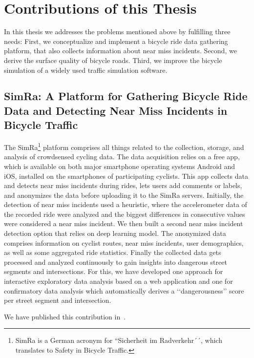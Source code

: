 \section{Contributions of this Thesis}
\label{sec:contributions}
In this thesis we addresses the problems mentioned above by fulfilling three needs:
First, we conceptualize and implement a bicycle ride data gathering platform, that also collects information about near miss incidents.
Second, we derive the surface quality of bicycle roads.
Third, we improve the bicycle simulation of a widely used traffic simulation software.

\subsection{SimRa: A Platform for Gathering Bicycle Ride Data and Detecting Near Miss Incidents in Bicycle Traffic}
\label{subsec:simra_contribution}
The SimRa\footnote{SimRa is a German acronym for ``Sicherheit im Radverkehr´´, which translates to Safety in Bicycle Traffic.} platform comprises all things related to the collection, storage, and analysis of crowdsensed cycling data.
The data acquisition relies on a free app, which is available on both major smartphone operating systems Android and iOS, installed on the smartphones of participating cyclists.
This app collects data and detects near miss incidents during rides, lets users add comments or labels, and anonymizes the data before uploading it to the SimRa servers.
Initially, the detection of near miss incidents used a heuristic, where the accelerometer data of the recorded ride were analyzed and the biggest differences in consecutive values were considered a near miss incident.
We then built a second near miss incident detection option that relies on deep learning model.
The anonymized data comprises information on cyclist routes, near miss incidents, user demographics, as well as some aggregated ride statistics.
Finally the collected data gets processed and analyzed continuously to gain insights into dangerous street segments and intersections.
For this, we have developed one approach for interactive exploratory data analysis based on a web application and one for confirmatory data analysis which automatically derives a ‘‘dangerousness’’ score per street segment and intersection. 

We have published this contribution in~\cite{karakaya2020simra,karakaya2022cyclesense}.

